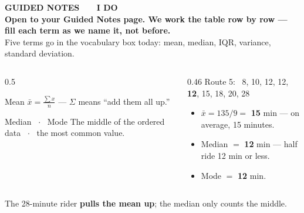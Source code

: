 \documentclass[aspectratio=169, 11pt]{beamer}
\newcommand{\redink}[1]{{\color{redacc}\bfseries #1}}
\begin{document}
{
\begin{frame}[plain]
  \vspace{1.8cm}\hspace{0.8cm}%
  \begin{minipage}{0.86\textwidth}
    {\color{goldacc}\bfseries\small GUIDED NOTES \ \textbullet\ \ I DO}\\[0.7cm]
    {\color{white}\bfseries\Large Open to your Guided Notes page. We work the table row by
    row --- fill each term as we name it, not before.}\\[0.9cm]
    {\color{frostmid}\small Five terms go in the vocabulary box today: mean, median, IQR,
    variance, standard deviation.}
  \end{minipage}
\end{frame}
}

\begin{frame}[t, plain]
  \vspace{2pt}
  \begin{columns}[t]
    \begin{column}{0.5\textwidth}
      \begin{block}{Mean}
        $\displaystyle \bar{x} = \frac{\sum x}{n}$ \quad --- $\Sigma$ means ``add them all up.''
      \end{block}
      \vspace{3pt}
      \begin{block}{Median \ $\cdot$ \ Mode}
        The middle of the ordered data \ $\cdot$ \ the most common value.
      \end{block}
    \end{column}
    \begin{column}{0.46\textwidth}
      {\small Route 5: \ 8, 10, 12, 12, \textbf{12}, 15, 18, 20, 28}
      \begin{itemize}\setlength{\itemsep}{3pt}
        \item $\bar{x} = 135/9 =$ \redink{15} min --- on average, 15 minutes.
        \item Median $=$ \redink{12} min --- half ride 12 min or less.
        \item Mode $=$ \redink{12} min.
      \end{itemize}
    \end{column}
  \end{columns}
  \vspace{10pt}
  \begin{center}
    {\large The 28-minute rider \redink{pulls the mean up}; the median only counts the middle.}
  \end{center}
\end{frame}
\end{document}
